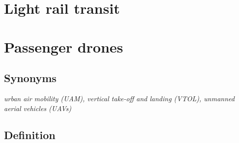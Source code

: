 \documentclass[
]{book}
\begin{document}
\hypertarget{light-rail-transit}{%
\section{Light rail transit}\label{light-rail-transit}}

\hypertarget{passenger-drones}{%
\section{Passenger drones}\label{passenger-drones}}

\hypertarget{synonyms-5}{%
\subsection*{Synonyms}\label{synonyms-5}}

\emph{urban air mobility (UAM), vertical take-off and landing (VTOL), unmanned aerial vehicles (UAVs)}

\hypertarget{definition-5}{%
\subsection*{Definition}\label{definition-5}}
\end{document}
